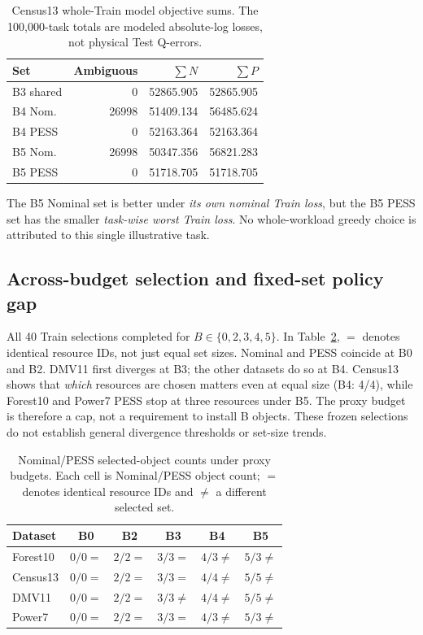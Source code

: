 \documentclass[sigconf, nonacm]{acmart}
\begin{document}
\begin{table}[t]
\caption{Census13 whole-Train model objective sums.
The 100,000-task totals are modeled absolute-log
losses, not physical Test Q-errors.}
\label{tab:train}
\centering\small
\begin{tabular}{@{}lrrr@{}}
\toprule
Set & Ambiguous & \(\sum N\) & \(\sum P\)\\
\midrule
B3 shared & 0 & 52865.905 & 52865.905\\
B4 Nom. & 26998 & 51409.134 & 56485.624\\
B4 PESS & 0 & 52163.364 & 52163.364\\
B5 Nom. & 26998 & 50347.356 & 56821.283\\
B5 PESS & 0 & 51718.705 & 51718.705\\
\bottomrule
\end{tabular}
\end{table}
The B5 Nominal set is better under \emph{its own nominal
Train loss}, but the B5 PESS set has the smaller
\emph{task-wise worst Train loss}.
No whole-workload greedy choice is attributed to
this single illustrative task.

\subsection{Across-budget selection and fixed-set policy gap}
All 40 Train selections completed for
\(B\in\{0,2,3,4,5\}\). In Table~\ref{tab:budget},
\(=\) denotes identical resource IDs, not just equal
set sizes. Nominal and PESS coincide at B0 and B2.
DMV11 first diverges at B3; the other datasets do
so at B4. Census13 shows that \emph{which} resources
are chosen matters even at equal size (B4: 4/4),
while Forest10 and Power7 PESS stop at three
resources under B5. The proxy budget is therefore a
cap, not a requirement to install B objects.
These frozen selections do not establish
general divergence thresholds or set-size trends.

\begin{table}[!tbp]
\caption{Nominal/PESS selected-object counts under
proxy budgets. Each cell is Nominal/PESS object count;
\(=\) denotes identical resource IDs and \(\ne\) a
different selected set.}
\label{tab:budget}
\centering\scriptsize
\begin{tabular}{@{}lccccc@{}}
\toprule
Dataset & B0 & B2 & B3 & B4 & B5\\
\midrule
Forest10 & \(0/0=\) & \(2/2=\) & \(3/3=\) & \(4/3\ne\) & \(5/3\ne\)\\
Census13 & \(0/0=\) & \(2/2=\) & \(3/3=\) & \(4/4\ne\) & \(5/5\ne\)\\
DMV11 & \(0/0=\) & \(2/2=\) & \(3/3\ne\) & \(4/4\ne\) & \(5/5\ne\)\\
Power7 & \(0/0=\) & \(2/2=\) & \(3/3=\) & \(4/3\ne\) & \(5/3\ne\)\\
\bottomrule
\end{tabular}
\end{table}
\end{document}
